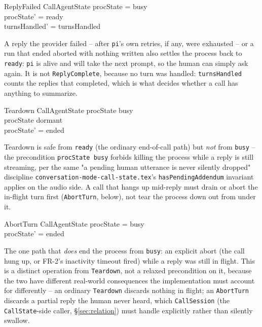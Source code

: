 \documentclass[a4paper,10pt,fleqn]{article}
\begin{document}
\begin{schema}{ReplyFailed}
  \Delta CallAgentState
  \where
  procState = busy \\
  procState' = ready \\
  turnsHandled' = turnsHandled
\end{schema}

A reply the provider failed -- after \texttt{pi}'s own retries, if any, were
exhausted -- or a run that ended aborted with nothing written also settles
the process back to \texttt{ready}: \texttt{pi} is alive and will take the
next prompt, so the human can simply ask again. It is not
\texttt{ReplyComplete}, because no turn was handled: \texttt{turnsHandled}
counts the replies that completed, which is what decides whether a call has
anything to summarize.

\begin{schema}{Teardown}
  \Delta CallAgentState
  \where
  procState \neq busy \\
  procState \neq dormant \\
  procState' = ended
\end{schema}

Teardown is safe from \texttt{ready} (the ordinary end-of-call path) but
\emph{not} from \texttt{busy} -- the precondition \texttt{procState \neq busy}
forbids killing the process while a reply is still streaming, per the same
"a pending human utterance is never silently dropped" discipline
\texttt{conversation-mode-call-state.tex}'s \texttt{hasPendingAddendum}
invariant applies on the audio side. A call that hangs up mid-reply must
drain or abort the in-flight turn first (\texttt{AbortTurn}, below), not
tear the process down out from under it.

\begin{schema}{AbortTurn}
  \Delta CallAgentState
  \where
  procState = busy \\
  procState' = ended
\end{schema}

The one path that \emph{does} end the process from \texttt{busy}: an explicit
abort (the call hung up, or FR-2's inactivity timeout fired) while a reply was
still in flight. This is a distinct operation from \texttt{Teardown}, not a
relaxed precondition on it, because the two have different real-world
consequences the implementation must account for differently -- an ordinary
\texttt{Teardown} discards nothing in flight; an \texttt{AbortTurn} discards a
partial reply the human never heard, which \texttt{CallSession} (the
\texttt{CallState}-side caller, \S\ref{sec:relation}) must handle explicitly
rather than silently swallow.
\end{document}
